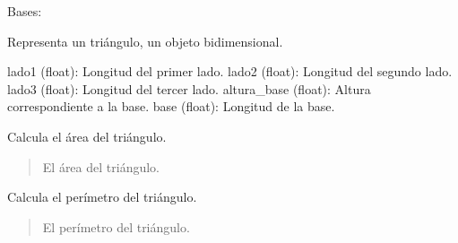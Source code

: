 \documentclass[letterpaper,10pt,spanish]{sphinxmanual}
\begin{document}

\begin{fulllineitems}
\label{\detokenize{pr8:pr8.3.Triangulo}}
\pysigstartsignatures
{}
\pysigstopsignatures
\sphinxAtStartPar
Bases: {\hyperref[\detokenize{pr8:pr8.3.Objeto2D}]{}}

\sphinxAtStartPar
Representa un triángulo, un objeto bidimensional.
\begin{description}
\sphinxAtStartPar
lado1 (float): Longitud del primer lado.
lado2 (float): Longitud del segundo lado.
lado3 (float): Longitud del tercer lado.
altura\_base (float): Altura correspondiente a la base.
base (float): Longitud de la base.

\end{description}

\begin{fulllineitems}
\label{\detokenize{pr8:pr8.3.Triangulo.area}}
\pysigstartsignatures
{}
\pysigstopsignatures
\sphinxAtStartPar
Calcula el área del triángulo.
\begin{quote}\begin{description}
\sphinxAtStartPar
El área del triángulo.

\end{description}\end{quote}

\end{fulllineitems}


\begin{fulllineitems}
\label{\detokenize{pr8:pr8.3.Triangulo.perimetro}}
\pysigstartsignatures
{}
\pysigstopsignatures
\sphinxAtStartPar
Calcula el perímetro del triángulo.
\begin{quote}\begin{description}
\sphinxAtStartPar
El perímetro del triángulo.

\end{description}\end{quote}

\end{fulllineitems}


\end{fulllineitems}
\end{document}
